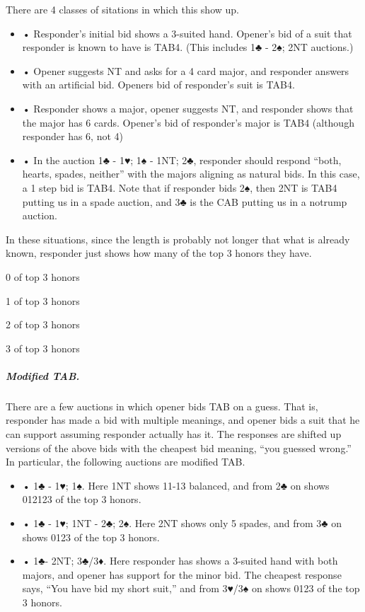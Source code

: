 \documentclass[10pt]{article}
\begin{document}
\begin{multicols*}{2}
 There are 4 classes of sitations
in which this show up.
\begin{itemize}
\item • Responder’s initial bid shows a 3-suited hand. Opener’s bid of a suit
  that responder is known to have is TAB4. (This includes 1♣ - 2♠; 2NT
  auctions.)
\item • Opener suggests NT and asks for a 4 card major, and responder answers
  with an artificial bid. Openers bid of responder’s suit is TAB4.
\item • Responder shows a major, opener suggests NT, and responder shows that
  the major has 6 cards. Opener’s bid of responder’s major is TAB4 (although
  responder has 6, not 4)
\item • In the auction 1♣ - 1♥; 1♠ - 1NT; 2♣, responder should respond “both,
  hearts, spades, neither” with the majors aligning as natural bids. In this
  case, a 1 step bid is TAB4. Note that if responder bids 2♠, then 2NT is TAB4
  putting us in a spade auction, and 3♣ is the CAB putting us in a notrump
  auction.
\end{itemize}
In these situations, since the length is probably not longer that what is already
known, responder just shows how many of the top 3 honors they have.
\begin{enumarate}
\item 0 of top 3 honors
\item 1 of top 3 honors
\item 2 of top 3 honors
\item 3 of top 3 honors
\end{enumarate}

\subparagraph{Modified TAB.}

There are a few auctions in which opener bids TAB on a
guess. That is, responder has made a bid with multiple meanings, and opener bids
a suit that he can support assuming responder actually has it. The responses are
shifted up versions of the above bids with the cheapest bid meaning, “you guessed
wrong.” In particular, the following auctions are modified TAB.
\begin{itemize}
\item • 1♣ - 1♥; 1♠. Here 1NT shows 11-13 balanced, and from 2♣ on shows
012123 of the top 3 honors.
\item • 1♣ - 1♥; 1NT - 2♣; 2♠. Here 2NT shows only 5 spades, and from 3♣ on
shows 0123 of the top 3 honors.
\item • 1♣- 2NT; 3♣/3♦. Here responder has shows a 3-suited hand with both
majors, and opener has support for the minor bid. The cheapest response
says, “You have bid my short suit,” and from 3♥/3♠ on shows 0123 of the
top 3 honors.
\end{itemize}


\end{multicols*}
\end{document}
